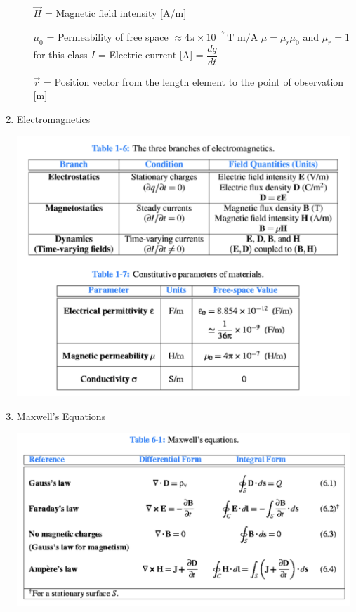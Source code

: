 \documentclass[10pt]{article}
\renewcommand{\frac}{\dfrac}
\begin{document}
\begin{enumerate}
\begin{itemize}
		$\vec{H}$ = Magnetic field intensity [A/m]

		$\mu_0$ = Permeability of free space \(\approx 4\pi \times 10^{-7} \, \text{T m/A}\)
		$\mu = \mu_r \mu_0$ and $\mu_r = 1$ for this class
		$I$ = Electric current [A] = $\frac{dq}{dt}$

		$\vec{r}$ = Position vector from the length element to the point of observation [m]
		\end{itemize}
		
	
		
	\item Electromagnetics
		
		\includegraphics[width=0.99\textwidth]{figs/Electromagnetics.png}
	
	\item Maxwell’s Equations
	
	\includegraphics[width=0.99\textwidth]{figs/MaxwellsEquations.png}
	

\end{enumerate}
\end{document}
